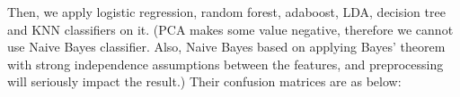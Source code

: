 \documentclass[12pt]{article}
\begin{document}
Then, we apply logistic regression, random forest, adaboost, LDA, decision tree and KNN classifiers on it. (PCA makes some value negative, therefore we cannot use Naive Bayes classifier. Also, Naive Bayes based on applying Bayes' theorem with strong independence assumptions between the features, and preprocessing will seriously impact the result.) Their confusion matrices are as below:
\begin{figure}[H]
\captionsetup[subfigure]{labelformat=empty}
\centering
{}
\end{figure}
\vspace*{-1.5cm}
\end{document}
